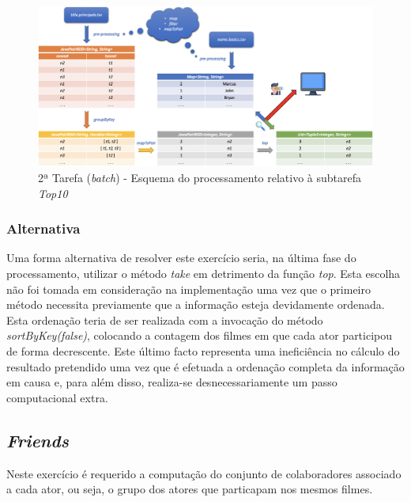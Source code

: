 \documentclass[a4paper]{report}
\begin{document}
            \begin{figure}[H]
                \centering
                \includegraphics[width=1.0\textwidth]{Images/Task 2 - Top10.png}
                \caption{2ª Tarefa (\textit{batch}) - Esquema do processamento relativo à subtarefa \textit{Top10}}
                \label{fig:17}
            \end{figure}

            \subsubsection{Alternativa} \label{sssec:Task2-Top10-Alternativa}
                Uma forma alternativa de resolver este exercício seria, na última fase do processamento, utilizar o método \textit{take} em detrimento da função \textit{top}.
                Esta escolha não foi tomada em consideração na implementação uma vez que o primeiro método necessita previamente que a informação esteja devidamente ordenada.
                Esta ordenação teria de ser realizada com a invocação do método \textit{sortByKey(false)}, colocando a contagem dos filmes em que cada ator participou de forma decrescente.
                Este último facto representa uma ineficiência no cálculo do resultado pretendido uma vez que é efetuada a ordenação completa da informação em causa e, para além disso, realiza-se desnecessariamente um passo computacional extra.

        \subsection{\textit{Friends}} \label{subsec:Task2-Friends}
            Neste exercício é requerido a computação do conjunto de colaboradores associado a cada ator, ou seja, o grupo dos atores que particapam nos mesmos filmes.
                
\end{document}
